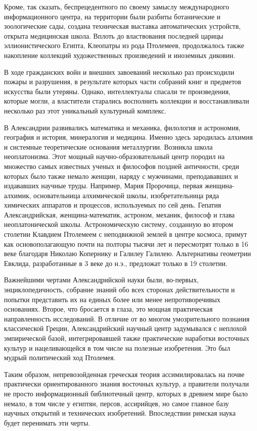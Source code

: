 Кроме, так сказать, беспрецедентного по своему замыслу международного информационного центра, на территории были разбиты ботанические и зоологические сады, создана техническая выставка автоматических устройств, открыта медицинская школа. Вплоть до властвования последней царицы эллионистического Египта, Клеопатры из рода Птолемеев, продолжалось также накопление коллекций художественных произведений и иноземных диковин. 

В ходе гражданских войн и внешних завоеваний несколько раз происходили пожары и разрушения, в результате которых части собраний книг и предметов искусства были утеряны. Однако, интеллектуалы спасали те произведения, которые могли, а властители старались восполнить коллекции и восстанавливали несколько раз этот уникальный культурный комплекс. 

В Александрии развивались математика и механика, филология и астрономия, география и история, минералогия и медицина. Именно здесь зародилась алхимия и системные теоретические основания металлургии. 
Возникла школа неоплатонизма. Этот мощный научно-образовательный центр породил на множество самых известных ученых и философов поздней античности, среди которых было также немало женщин, наряду с мужчинами, преподававших и издававших научные труды. 
Например, Мария Пророчица, первая женщина-алхимик, основательница алхимической школы, изобретательница ряда химических аппаратов и процессов, используемых по сей день. 
Гепатия Александрийская, женщина-математик, астроном, механик, философ и глава неоплатонической школы. Астрономическую систему, созданную во втором столетии Клавдием Птолемеем с неподвижной землей в центре космоса, примут как основополагающую почти на полторы тысячи лет и пересмотрят только в 16 веке благодаря Николаю Копернику и Галилеу Галилею.  
Альтернативы геометрии Евклида, разработанные в 3 веке до н.э., предложат только в 19 столетии. 

Важнейшими чертами Александрийской науки были, во-первых, энциклопедичность, собрание знаний обо всех сторонах действительности и попытки представить их на единых более или менее непротиворечивых основаниях. 
Второе, что бросается в глаза, это мощная практическая направленность исследований. В отличие от во многом умозрительного познания классической Греции, Александрийский научный центр задумывался с неплохой эмпирической базой, интегрировавшей также практические наработки восточных культур и нацеливающейся в том числе на полезные изобретения. Это был мудрый политический ход Птолемея. 

Таким образом, непревозойденная греческая теория ассимилировалась на почве практически ориентированного знания восточных культур, а правители получали не просто информационный библиотечный центр, которых в древнем мире было немало, в том числе у египтян, персов, ассирийцев, но самое главное базу научных открытий и технических изобретений. Впоследствии римская наука будет перенимать эти черты. 

